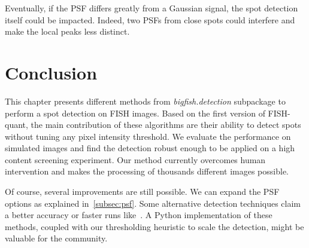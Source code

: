 Eventually, if the \ac{PSF} differs greatly from a Gaussian signal, the spot detection itself could be impacted.
Indeed, two \ac{PSF}s from close spots could interfere and make the local peaks less distinct.


\section{Conclusion}
\label{sec:detection_conclusion}

This chapter presents different methods from \emph{bigfish.detection} subpackage to perform a spot detection on \ac{FISH} images.
Based on the first version of FISH-quant, the main contribution of these algorithms are their ability to detect spots without tuning any pixel intensity threshold.
We evaluate the performance on simulated images and find the detection robust enough to be applied on a high content screening experiment.
Our method currently overcomes human intervention and makes the processing of thousands different images possible.

Of course, several improvements are still possible.
We can expand the \ac{PSF} options as explained in~\ref{subsec:psf}.
Some alternative detection techniques claim a better accuracy or faster runs like~\cite{bahry_rs-fish_2021}.
A Python implementation of these methods, coupled with our thresholding heuristic to scale the detection, might be valuable for the community.

